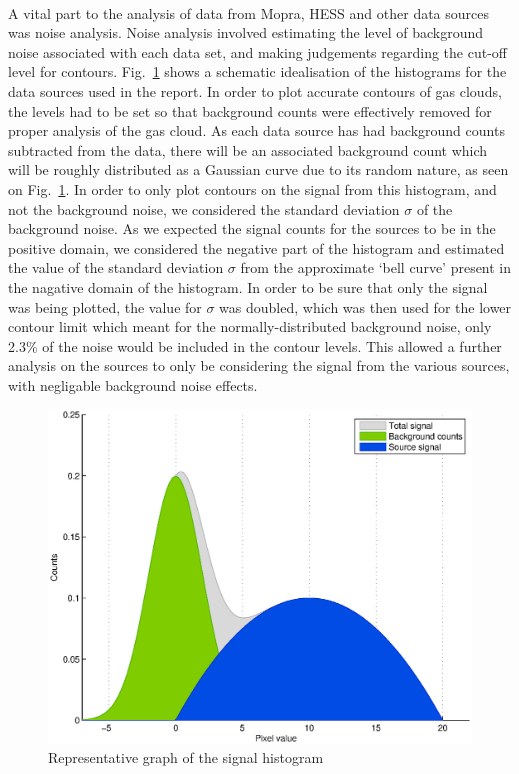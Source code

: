 \documentclass[a4paper, titlepage, oneside]{article}
\begin{document}
\begin{multicols}{2}
\paragraph{}
A vital part to the analysis of data from Mopra, HESS and other data sources was noise analysis. Noise analysis involved estimating the level of background noise associated with each data set, and making judgements regarding the cut-off level for contours. Fig.~\ref{fig:noise} shows a schematic idealisation of the histograms for the data sources used in the report. In order to plot accurate contours of gas clouds, the levels had to be set so that background counts were effectively removed for proper analysis of the gas cloud. As each data source has had background counts subtracted from the data, there will be an associated background count which will be roughly distributed as a Gaussian curve due to its random nature, as seen on Fig.~\ref{fig:noise}. In order to only plot contours on the signal from this histogram, and not the background noise, we considered the standard deviation \(\sigma\) of the background noise. As we expected the signal counts for the sources to be in the positive domain, we considered the negative part of the histogram and estimated the value of the standard deviation \(\sigma\) from the approximate `bell curve' present in the nagative domain of the histogram. In order to be sure that only the signal was being plotted, the value for \(\sigma\) was doubled, which was then used for the lower contour limit which meant for the normally-distributed background noise, only 2.3\% of the noise would be included in the contour levels. This allowed a further analysis on the sources to only be considering the signal from the various sources, with negligable background noise effects.

\begin{figure}[H]
  \centering
  \includegraphics[width = \columnwidth]{figures/noise-analysis}
  \caption{Representative graph of the signal histogram}
  \label{fig:noise}
\end{figure}


\end{multicols}
\end{document}
